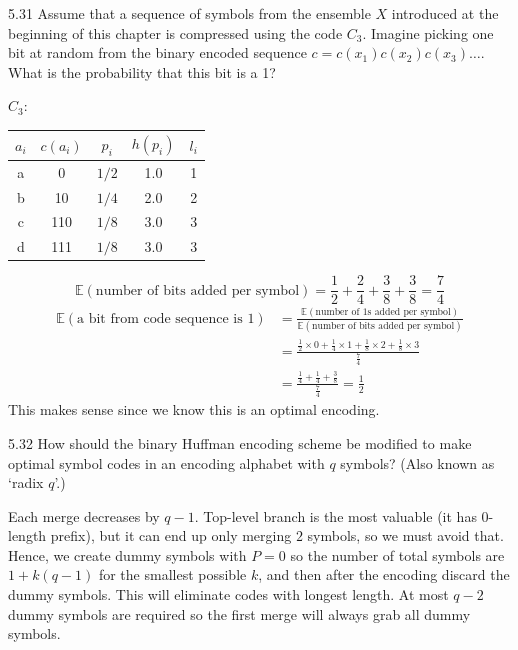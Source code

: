 \documentclass[12pt, a4paper]{article}
\begin{document}
\begin{prob}{5.31}
    Assume that a sequence of symbols from the ensemble $X$ introduced at the beginning of this chapter is compressed using the code $C_3$. Imagine picking one bit at random from the binary encoded sequence $c = c(x_1)c(x_2)c(x_3)\dots$. What is the probability that this bit is a 1? \\


\centering

$C_3$:
\vspace{2pt}

\begin{tabular}{ccccc}
\hline
$a_i$ & $c(a_i)$ & $p_i$ & $h(p_i)$ & $l_i$ \\
\hline
a & 0 & $1/2$ & 1.0 & 1 \\
b & 10 & $1/4$ & 2.0 & 2 \\
c & 110 & $1/8$ & 3.0 & 3 \\
d & 111 & $1/8$ & 3.0 & 3 \\
\hline
\end{tabular}

\end{prob}
\begin{sol}
$$\mathbb{E}(\text{number of bits added per symbol}) = \frac{1}{2} + \frac{2}{4} + \frac{3}{8} + \frac{3}{8} = \frac{7}{4}$$
\begin{align*}
    \mathbb{E}(\text{a bit from code sequence is 1}) &= \frac{\mathbb{E}(\text{number of 1s added per symbol})}{\mathbb{E}(\text{number of bits added per symbol})} \\
    &= \frac{\frac{1}{2} \times 0 + \frac{1}{4} \times 1 + \frac{1}{8} \times 2 + \frac{1}{8} \times 3}{\frac{7}{4}} \\&
    = \frac{\frac{1}{4} + \frac{1}{4} + \frac{3}{8}}{\frac{7}{4}} = \frac{1}{2}
\end{align*}
This makes sense since we know this is an optimal encoding.
\end{sol}
\bigskip


\begin{prob}{5.32}
    How should the binary Huffman encoding scheme be modified to make optimal symbol codes in an encoding alphabet with $q$ symbols?
    (Also known as `radix $q$'.)
\end{prob}
\begin{sol}
Each merge decreases by $q - 1$. Top-level branch is the most valuable (it has 0-length prefix), but it can end up only merging $2$ symbols, so we must avoid that. 
Hence, we create dummy symbols with $P = 0$ so the number of total symbols are $1 + k(q - 1)$ for the smallest possible $k$, and then after the encoding discard the dummy symbols.
This will eliminate codes with longest length. At most $q - 2$ dummy symbols are required so the first merge will always grab all dummy symbols.
\end{sol}
\bigskip
\end{document}
